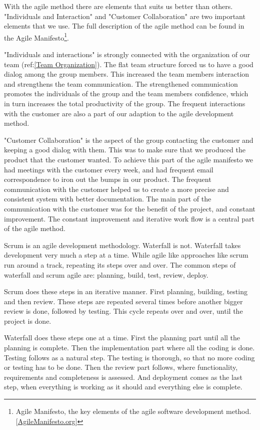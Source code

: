     With the agile method there are elements that suits us better than others. "Individuals and Interaction" and "Customer Collaboration" are two important elements that we use. The full description of the agile method can be found in the Agile Manifesto\footnote
        {Agile Manifesto, the key elements of the agile software development method. [\href{http://http://agilemanifesto.org/}{AgileManifesto.org}]}.
    
    "Individuals and interactions" is strongly connected with the organization of our team (ref:\ref{Team Organization}). The flat team structure forced us to have a good dialog among the group members. This increased the team members interaction and strengthens the team communication. The strengthened communication promotes the individuals of the group and the team members confidence, which in turn increases the total productivity of the group. The frequent interactions with the customer are also a part of our adaption to the agile development method. 
    
    "Customer Collaboration" is the aspect of the group contacting the customer and keeping a good dialog with them. This was to make sure that we produced the product that the customer wanted. To achieve this part of the agile manifesto we had meetings with the customer every week, and had frequent email correspondence to iron out the bumps in our product. The frequent communication with the customer helped us to create a more precise and consistent system with better documentation. The main part of the communication with the customer was for the benefit of the project, and constant improvement. The constant improvement and iterative work flow is a central part of the agile method. 
    
    Scrum is an agile development methodology. Waterfall is not. Waterfall takes development very much a step at a time. While agile like approaches like scrum run around a track, repeating its steps over and over. The common steps of waterfall and scrum agile are: planning, build, test, review, deploy. 
               
    Scrum does these steps in an iterative manner. First planning, building, testing and then review. These steps are repeated several times before another bigger review is done, followed by testing. This cycle repeats over and over, until the project is done. 
    
    Waterfall  does these steps one at a time. First the planning part until all the planning is complete. Then the implementation part where all the coding is done. Testing follows as a natural step. The testing is thorough, so that no more coding or testing has to be done. Then the review part follows, where functionality, requirements and completeness is assessed. And deployment comes as the last step, when everything is working as it should and everything else is complete.  
    
